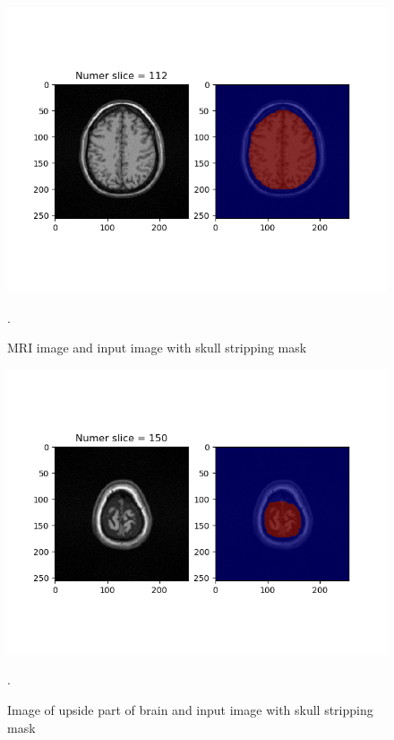 \begin{figure}[H]
\centering{}\includegraphics[scale=0.8]{figures/M8_Figure_1-4.png}\caption{MRI image and input image with skull stripping mask}.
\label{fig:figures/Module8_Figure_3}
\end{figure}
\begin{figure}[H]
\centering{}\includegraphics[scale=0.8]{figures/M8_Figure_1-6.png}\caption{Image of upside part of brain and input image with skull stripping mask}.
\label{fig:figures/Module8_Figure_4}
\end{figure}